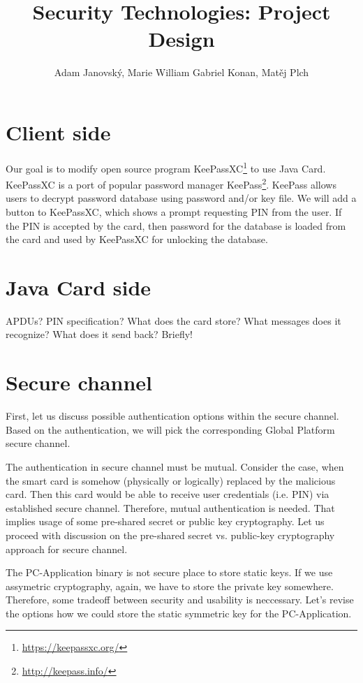 \documentclass[12pt,a4paper]{article}
\title{Security Technologies: Project Design}
\author{Adam Janovský, Marie William Gabriel Konan, Matěj Plch}
\date{}
\begin{document}
\maketitle

\section{Client side}
Our goal is to modify open source program KeePassXC\footnote{\url{https://keepassxc.org/}} to use Java Card. KeePassXC is a port of popular password manager KeePass\footnote{\url{http://keepass.info/}}. KeePass allows users to decrypt password database using password and/or key file. We will add a button to KeePassXC, which shows a prompt requesting PIN from the user. If the PIN is accepted by the card, then password for the database is loaded from the card and used by KeePassXC for unlocking the database.

\section{Java Card side}
APDUs? PIN specification? What does the card store? What messages does it recognize? What does it send back? Briefly!

\section{Secure channel}
First, let us discuss possible authentication options within the secure channel. Based on the authentication, we will pick the corresponding Global Platform secure channel.

The authentication in secure channel must be mutual. Consider the case, when the smart card is somehow (physically or logically) replaced by the malicious card. Then this card would be able to receive user credentials (i.e. PIN) via established secure channel. Therefore, mutual authentication is needed. That implies usage of some pre-shared secret or public key cryptography. Let us proceed with discussion on the pre-shared secret vs. public-key cryptography approach for secure channel. 

The PC-Application binary is not secure place to store static keys. If we use assymetric cryptography, again, we have to store the private key somewhere. 
Therefore, some tradeoff between security and usability is neccessary. Let's revise the options how we could store the static symmetric key for the PC-Application.
\end{document}
